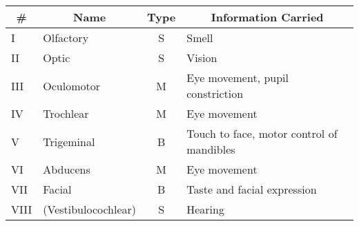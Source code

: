 \begin{table}[htbp]
    \centering
    \begin{tabular}{p{0.7cm}p{3.3cm}cp{9cm}}
        \toprule
        \multicolumn{1}{c}{\textbf{\#}} & \multicolumn{1}{c}{\textbf{Name}}     & \multicolumn{1}{c}{\textbf{Type}} & \multicolumn{1}{c}{\textbf{Information Carried}}                                                                           \\
        \midrule
        I                               & Olfactory                             & S                                 & Smell                                                                                                                      \\
        II                              & Optic                                 & S                                 & Vision                                                                                                                     \\
        III                             & Oculomotor                            & M                                 & Eye movement, pupil constriction                                                                                           \\
        IV                              & Trochlear                             & M                                 & Eye movement                                                                                                               \\
        V                               & Trigeminal                            & B                                 & Touch to face, motor control of mandibles                                                                                  \\
        VI                              & Abducens                              & M                                 & Eye movement                                                                                                               \\
        VII                             & Facial                                & B                                 & Taste and facial expression                                                                                                \\
        VIII                            & (Vestibulocochlear) & S                                 & Hearing                                                                                                                    \\

\end{tabular}
\end{table}
